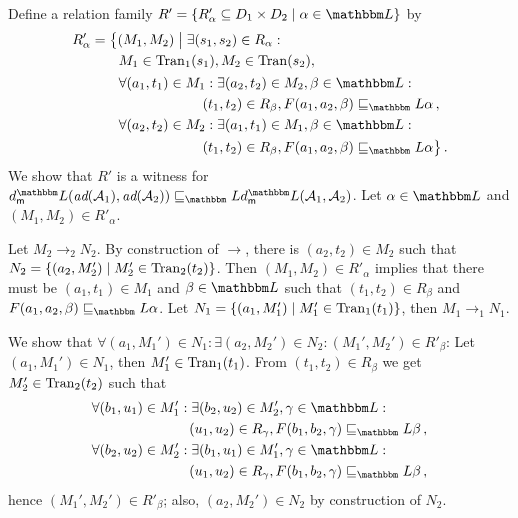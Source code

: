 \documentclass[twocolumn]{svjour3-dummy}
\newcommand*{\must}[1]{\overset{#1}{\longrightarrow}}
\newcommand*{\omust}{\mathord{\must{}}}
\newcommand*\cA{\mathcal A}
\newcommand*\Tran{\textup{\textrm{Tran}}}
\newcommand*\LL{\mathbbm L}
\begin{document}
  Define a relation family $R'=\{ R'_\alpha\subseteq D_1\times D_2\mid
  \alpha\in \LL\}$ by
  \begin{align*}
    R'_\alpha &= \big\{ ( M_1, M_2)\bigmid \exists( s_1, s_2)\in
    R_\alpha: \\
    &\qquad M_1\in \Tran_1( s_1), M_2\in \Tran( s_2), \\
    &\qquad
    \begin{aligned}
      & \forall( a_1, t_1)\in M_1: \exists( a_2, t_2)\in M_2, \beta\in
      \LL: \\
      &\hspace*{6em} ( t_1, t_2)\in R_\beta, F( a_1, a_2,
      \beta)\sqsubseteq_\LL \alpha\,, \\
      & \forall( a_2, t_2)\in M_2: \exists( a_1, t_1)\in M_1, \beta\in
      \LL: \\
      &\hspace*{6em} ( t_1, t_2)\in R_\beta, F( a_1, a_2,
      \beta)\sqsubseteq_\LL \alpha\big\}\,.
    \end{aligned}
  \end{align*}
  We show that $R'$ is a witness for $\mdl( \bd( \cA_1), \bd(
  \cA_2))\sqsubseteq_\LL \mdl( \cA_1, \cA_2)$.  Let $\alpha\in \LL$ and
  $( M_1, M_2)\in R'_\alpha$.

  Let $M_2\must{}_2 N_2$.  By construction of $\omust$, there is $( a_2,
  t_2)\in M_2$ such that $N_2=\{( a_2, M_2')\mid M_2'\in \Tran_2(
  t_2)\}$.  Then $( M_1, M_2)\in R'_\alpha$ implies that there must be
  $( a_1, t_1)\in M_1$ and $\beta\in \LL$ such that $( t_1, t_2)\in
  R_\beta$ and $F( a_1, a_2, \beta)\sqsubseteq_\LL \alpha$.  Let
  $N_1=\{( a_1, M_1')\mid M_1'\in \Tran_1( t_1)\}$, then $M_1\must{}_1
  N_1$.

  We show that $\forall( a_1, M_1')\in N_1: \exists( a_2, M_2')\in N_2:(
  M_1', M_2')\in R'_\beta$: Let $( a_1, M_1')\in N_1$, then $M_1'\in
  \Tran_1( t_1)$.  From $( t_1, t_2)\in R_\beta$ we get $M_2'\in
  \Tran_2( t_2)$ such that
  \begin{align*}
    & \forall( b_1, u_1)\in M_1': \exists( b_2, u_2)\in M_2', \gamma\in
    \LL:\\
    &\hspace*{7em} ( u_1, u_2)\in R_\gamma, F( b_1, b_2,
    \gamma)\sqsubseteq_\LL \beta\,, \\
    & \forall( b_2, u_2)\in M_2': \exists( b_1, u_1)\in M_1', \gamma\in
    \LL:\\
    &\hspace*{7em} ( u_1, u_2)\in R_\gamma, F( b_1, b_2,
    \gamma)\sqsubseteq_\LL \beta\,,
  \end{align*}
  hence $( M_1', M_2')\in R'_\beta$; also, $( a_2, M_2')\in N_2$ by
  construction of $N_2$.
\end{document}
